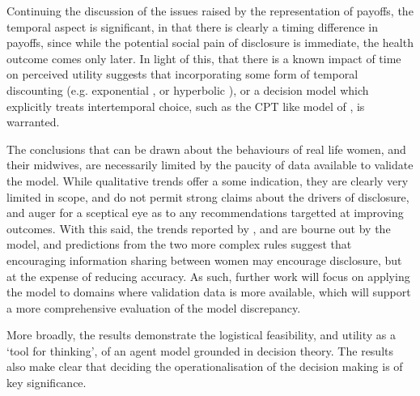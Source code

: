 Continuing the discussion of the issues raised by the representation of payoffs, the temporal aspect is significant, in that there is clearly a timing difference in payoffs, since while the potential social pain of disclosure is immediate, the health outcome comes only later. In light of this, that there is a known impact of time on perceived utility \citet{Thaler1981} suggests that incorporating some form of temporal discounting (e.g. exponential \citep{Samuelson1937}, or hyperbolic \citep{Ainslie1991}), or a decision model which explicitly treats intertemporal choice, such as the \ac{CPT} like model of \citet{Loewenstein1992}, is warranted. 

The conclusions that can be drawn about the behaviours of real life women, and their midwives, are necessarily limited by the paucity of data available to validate the model. While qualitative trends offer a some indication, they are clearly very limited in scope, and do not permit strong claims about the drivers of disclosure, and auger for a sceptical eye as to any recommendations targetted at improving outcomes.  With this said, the trends reported by \citet{Alvik2006}, and \citet{Phillips2007} are bourne out by the model, and predictions from the two more complex rules suggest that encouraging information sharing between women may encourage disclosure, but at the expense of reducing accuracy. As such, further work will focus on applying the model to domains where validation data is more available, which will support a more comprehensive evaluation of the model discrepancy.

More broadly, the results demonstrate the logistical feasibility, and utility as a `tool for thinking', of an agent model grounded in decision theory. The results also make clear that deciding the operationalisation of the decision making is of key significance.

